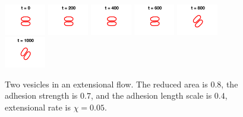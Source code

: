 \documentclass[aps,prl,twocolumn,showpacs,amsmath,amssymb]{revtex4-1}
\begin{document}
\begin{figure}[htp]
  \includegraphics[width = 0.16\textwidth]{figs/extensional_adR4em1adS7em1Chi5em2_ra080_image01.png}
  \includegraphics[width = 0.16\textwidth]{figs/extensional_adR4em1adS7em1Chi5em2_ra080_image02.png}
  \includegraphics[width = 0.16\textwidth]{figs/extensional_adR4em1adS7em1Chi5em2_ra080_image03.png}
  \includegraphics[width = 0.16\textwidth]{figs/extensional_adR4em1adS7em1Chi5em2_ra080_image04.png}
  \includegraphics[width = 0.16\textwidth]{figs/extensional_adR4em1adS7em1Chi5em2_ra080_image05.png}
  \includegraphics[width = 0.16\textwidth]{figs/extensional_adR4em1adS7em1Chi5em2_ra080_image06.png}
  \caption{Two vesicles in an extensional flow.  The reduced area is
  $0.8$, the adhesion strength is $0.7$, and the adhesion length scale
is $0.4$, extensional rate is $\chi = 0.05$.}
\end{figure}
\end{document}
